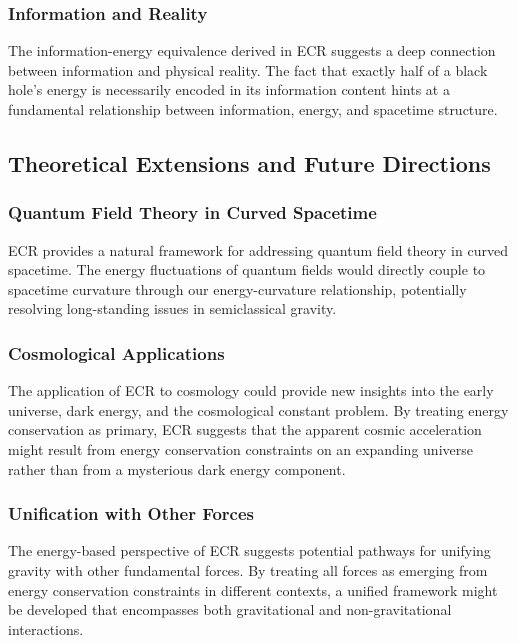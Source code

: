 \documentclass[11pt,a4paper]{article}
\begin{document}
\subsubsection{Information and Reality}

The information-energy equivalence derived in ECR suggests a deep connection between information and physical reality. The fact that exactly half of a black hole's energy is necessarily encoded in its information content hints at a fundamental relationship between information, energy, and spacetime structure.

\subsection{Theoretical Extensions and Future Directions}

\subsubsection{Quantum Field Theory in Curved Spacetime}

ECR provides a natural framework for addressing quantum field theory in curved spacetime. The energy fluctuations of quantum fields would directly couple to spacetime curvature through our energy-curvature relationship, potentially resolving long-standing issues in semiclassical gravity.

\subsubsection{Cosmological Applications}

The application of ECR to cosmology could provide new insights into the early universe, dark energy, and the cosmological constant problem. By treating energy conservation as primary, ECR suggests that the apparent cosmic acceleration might result from energy conservation constraints on an expanding universe rather than from a mysterious dark energy component.

\subsubsection{Unification with Other Forces}

The energy-based perspective of ECR suggests potential pathways for unifying gravity with other fundamental forces. By treating all forces as emerging from energy conservation constraints in different contexts, a unified framework might be developed that encompasses both gravitational and non-gravitational interactions.
\end{document}
